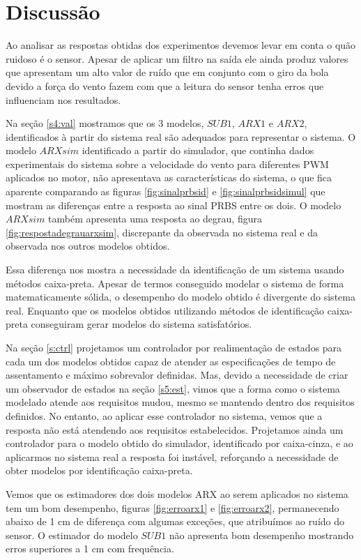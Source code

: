 \section{Discussão}

Ao analisar as respostas obtidas dos experimentos devemos levar em conta o quão ruidoso é o sensor. Apesar de aplicar um filtro na saída ele ainda produz valores que apresentam um alto valor de ruído que em conjunto com o giro da bola devido a força do vento fazem com que a leitura do sensor tenha erros que influenciam nos resultados.


Na seção \ref{s4:val} mostramos que os 3 modelos, $SUB1$, $ARX1$ e $ARX2$, identificados à partir do sistema real são adequados para representar o sistema. O modelo $ARXsim$ identificado a partir do simulador, que continha dados experimentais do sistema sobre a velocidade do vento para diferentes PWM aplicados no motor, não apresentava as características do sistema, o que fica aparente comparando as figuras \ref{fig:sinalprbsid} e \ref{fig:sinalprbsidsimul} que mostram as diferenças entre a resposta ao sinal PRBS entre os dois. O modelo $ARXsim$ também apresenta uma resposta ao degrau, figura \ref{fig:respostadegrauarxsim}, discrepante da observada no sistema real e da observada nos outros modelos obtidos.


Essa diferença nos mostra a necessidade da identificação de um sistema usando métodos caixa-preta. Apesar de termos conseguido modelar o sistema de forma matematicamente sólida, o desempenho do modelo obtido é divergente do sistema real. Enquanto que os modelos obtidos utilizando métodos de identificação caixa-preta conseguiram gerar modelos do sistema satisfatórios. 


Na seção \ref{s:ctrl} projetamos um controlador por realimentação de estados para cada um dos modelos obtidos capaz de atender as especificações de tempo de assentamento e máximo sobrevalor definidas. Mas, devido a necessidade de criar um observador de estados na seção \ref{s5:est}, vimos que a forma como o sistema modelado atende aos requisitos mudou, mesmo se mantendo dentro dos requisitos definidos. No entanto, ao aplicar esse controlador no sistema, vemos que a resposta não está atendendo aos requisitos estabelecidos. Projetamos ainda um controlador para o modelo obtido do simulador, identificado por caixa-cinza, e ao aplicarmos no sistema real a resposta foi instável, reforçando a necessidade de obter modelos por identificação caixa-preta.


Vemos que os estimadores dos dois modelos ARX ao serem aplicados no sistema tem um bom desempenho, figuras \ref{fig:erroarx1} e \ref{fig:erroarx2}, permanecendo abaixo de 1 cm de diferença com algumas exceções, que atribuímos ao ruído do sensor. O estimador do modelo $SUB1$ não apresenta bom desempenho mostrando erros superiores a 1 cm com frequência.








